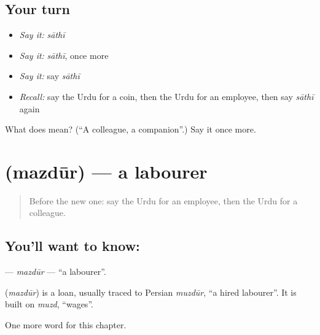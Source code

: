 \subsection*{Your turn}
\begin{itemize}
\raggedright
  \item \emph{Say it:} \emph{sāthī}
  \item \emph{Say it:} \emph{sāthī}, once more
  \item \emph{Say it:} say \emph{sāthī}
  \item \emph{Recall:} say the Urdu for a coin, then the Urdu for an employee, then say \emph{sāthī} again
\end{itemize}

\begin{tcolorbox}[breakable,colback=teal!4,colframe=teal!35!black,title={Before you move on}]
What does  mean? (\textquotedblleft{}A colleague, a companion\textquotedblright{}.) Say it once more.
\end{tcolorbox}
\section[\texorpdfstring{\ur{مزدور} (mazdūr)}{مزدور (mazdūr)}]{ (mazdūr) — a labourer}

\label{lesson:UR-C177-mazdur}



\begin{quote}
Before the new one: say the Urdu for an employee, then the Urdu for a colleague.
\end{quote}

\subsection*{You'll want to know: }
\textbf{} — \emph{mazdūr} — \textquotedblleft{}a labourer\textquotedblright{}.

\begin{cousinweb}
\textbf{} (\emph{mazdūr}) is a loan, usually traced to Persian \emph{muzdūr}, \textquotedblleft{}a hired labourer\textquotedblright{}. It is built on \emph{muzd}, \textquotedblleft{}wages\textquotedblright{}.
\end{cousinweb}

\begin{grammarlens}[title={What you've built}]
One more word for this chapter.
\end{grammarlens}

